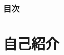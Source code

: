 \newcommand\ballref[1]{%
\tikz \node[circle, shade,ball color=structure.fg,inner sep=0pt,%
  text width=8pt,font=\tiny,align=center] {\color{white}\ref{#1}};
}



\frame{\maketitle}

\begin{frame}
  \frametitle{目次}

  \tableofcontents
\end{frame}

\section{自己紹介}
